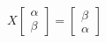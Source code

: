 \documentclass[preview]{standalone}
\begin{document}
\begin{align*}
X \begin{bmatrix} \alpha \\ \beta \end{bmatrix} = \begin{bmatrix} \beta \\ \alpha \end{bmatrix}
\end{align*}
\end{document}
